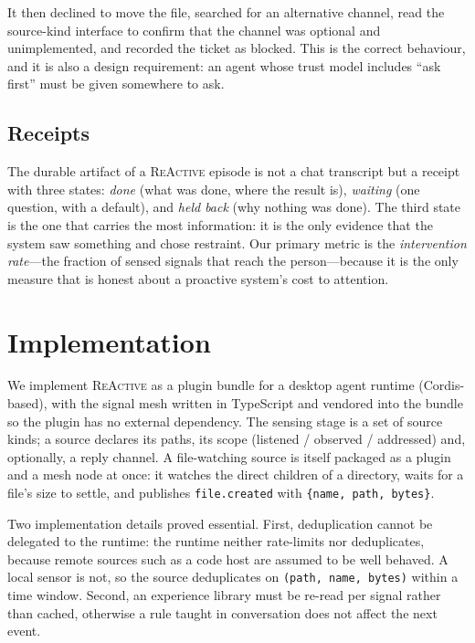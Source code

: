\documentclass[10pt,a4paper]{article}
\newcommand{\sys}{\textsc{ReActive}}
\begin{document}
It then declined to move the file, searched for an alternative channel, read
the source-kind interface to confirm that the channel was optional and
unimplemented, and recorded the ticket as blocked. This is the correct
behaviour, and it is also a design requirement: an agent whose trust model
includes ``ask first'' must be given somewhere to ask.

\subsection{Receipts}

The durable artifact of a \sys{} episode is not a chat transcript but a
receipt with three states: \emph{done} (what was done, where the result is),
\emph{waiting} (one question, with a default), and \emph{held back} (why
nothing was done). The third state is the one that carries the most
information: it is the only evidence that the system saw something and chose
restraint. Our primary metric is the \emph{intervention rate}---the fraction
of sensed signals that reach the person---because it is the only measure
that is honest about a proactive system's cost to attention.

\section{Implementation}
\label{sec:impl}

We implement \sys{} as a plugin bundle for a desktop agent runtime
(Cordis-based), with the signal mesh written in TypeScript and vendored into
the bundle so the plugin has no external dependency. The sensing stage is a
set of source kinds; a source declares its paths, its scope (listened /
observed / addressed) and, optionally, a reply channel. A file-watching
source is itself packaged as a plugin and a mesh node at once: it watches the
direct children of a directory, waits for a file's size to settle, and
publishes \texttt{file.created} with \texttt{\{name, path, bytes\}}.

Two implementation details proved essential. First, deduplication cannot be
delegated to the runtime: the runtime neither rate-limits nor deduplicates,
because remote sources such as a code host are assumed to be well behaved. A
local sensor is not, so the source deduplicates on \texttt{(path, name,
bytes)} within a time window. Second, an experience library must be re-read
per signal rather than cached, otherwise a rule taught in conversation does
not affect the next event.
\end{document}
